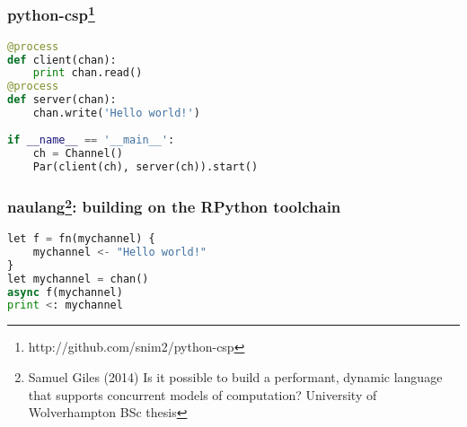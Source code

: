 \documentclass[compress]{beamer}
\begin{document}
\begin{frame}[fragile]
    \frametitle{python-csp\footnote{http://github.com/snim2/python-csp}}
    \begin{lstlisting}[language=python]
@process
def client(chan):
    print chan.read()
@process
def server(chan):
    chan.write('Hello world!')
    
if __name__ == '__main__':
    ch = Channel()
    Par(client(ch), server(ch)).start()
    \end{lstlisting}
\end{frame}

\begin{frame}[fragile]
    \frametitle{naulang\footnote{Samuel Giles (2014) Is it possible to build a performant, dynamic language that supports concurrent models of computation? University of Wolverhampton BSc thesis}: building on the RPython toolchain}
    \begin{lstlisting}[language=python,morekeywords={let,fn,async,print,chan}]
let f = fn(mychannel) {
    mychannel <- "Hello world!"
}
let mychannel = chan()
async f(mychannel)
print <: mychannel
    \end{lstlisting}
\end{frame}

\end{document}
